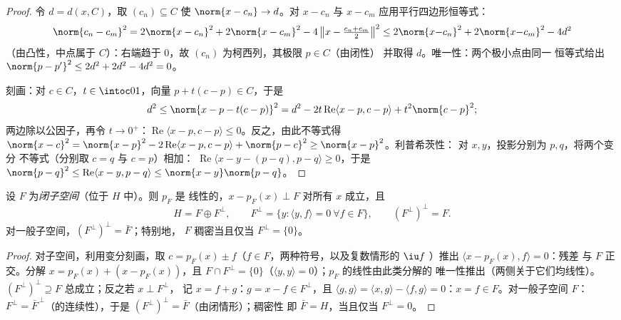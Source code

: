 \begin{proof}
令 $d = d(x, C)$，取 $(c_n) \subseteq C$ 使 $\norm{x - c_n}
\to d$。对 $x - c_n$ 与 $x - c_m$ 应用平行四边形恒等式：
\[
\norm{c_n - c_m}^2 = 2\norm{x - c_n}^2 + 2\norm{x - c_m}^2 -
4\,\bigl\|x - \tfrac{c_n + c_m}2\bigr\|^2
\leq 2\norm{x{-}c_n}^2 + 2\norm{x{-}c_m}^2 - 4d^2
\]
（由凸性，中点属于 $C$）：右端趋于
$0$，故 $(c_n)$ 为柯西列，其极限 $p \in C$（由闭性）
并取得 $d$。唯一性：两个极小点由同一
恒等式给出 $\norm{p - p'}^2 \leq 2d^2 + 2d^2 - 4d^2 = 0$。

刻画：对 $c \in C$，$t \in \intoc01$，向量
$p + t(c - p) \in C$，于是
\[
d^2 \leq \norm{x - p - t(c-p)}^2
= d^2 - 2t\operatorname{Re}\langle x - p, c - p\rangle +
t^2\norm{c-p}^2 ;
\]
两边除以公因子，再令 $t \to 0^+$：$\operatorname{Re}\langle x - p, c -
p\rangle \leq 0$。反之，由此不等式得 $\norm{x -
c}^2 = \norm{x - p}^2 - 2\operatorname{Re}\langle x - p, c -
p\rangle + \norm{p - c}^2 \geq \norm{x-p}^2$。利普希茨性：
对 $x, y$，投影分别为 $p, q$，将两个变分
不等式（分别取 $c = q$ 与 $c = p$）相加：
$\operatorname{Re}\langle x - y - (p - q), p - q\rangle \geq
0$，于是 $\norm{p - q}^2 \leq \operatorname{Re}\langle x - y, p -
q\rangle \leq \norm{x - y}\norm{p - q}$。
\end{proof}

\begin{theorem}[正交分解]
\label{thm:b3:hilbert:decomposition}
设 $F$ 为\emph{闭子空间}（位于 $H$ 中）。则 $p_F$ 是
线性的，$x - p_F(x) \perp F$ 对所有 $x$ 成立，且
\[
H = F \oplus F^\perp,
\qquad F^\perp = \{y : \langle y, f\rangle = 0\ \forall f\in
F\},
\qquad (F^\perp)^\perp = F .
\]
对一般子空间，$(F^\perp)^\perp = \bar F$；特别地，
$F$ 稠密当且仅当 $F^\perp = \{0\}$。
\end{theorem}

\begin{proof}
对子空间，利用变分刻画，取 $c =
p_F(x) \pm f$（$f \in F$，两种符号，以及复数情形的 $\iu f$
）推出 $\langle x - p_F(x), f\rangle = 0$：残差
与 $F$ 正交。分解 $x = p_F(x) + (x
- p_F(x))$，且 $F \cap F^\perp = \{0\}$（$\langle y, y
\rangle = 0$）；$p_F$ 的线性由此类分解的
唯一性推出（两侧关于它们均线性）。$(F^\perp)
^\perp \supseteq F$ 总成立；反之若 $x \perp F^\perp$，
记 $x = f + g$：$g = x - f \in F^\perp$，且 $\langle g,
g\rangle = \langle x, g\rangle - \langle f, g\rangle = 0$：$x
= f \in F$。对一般子空间 $F$：$F^\perp = \bar
F^{\,\perp}$（的连续性），于是
$(F^\perp)^\perp = \bar F$（由闭情形）；稠密性
即 $\bar F = H$，当且仅当 $F^\perp = 0$。
\end{proof}

